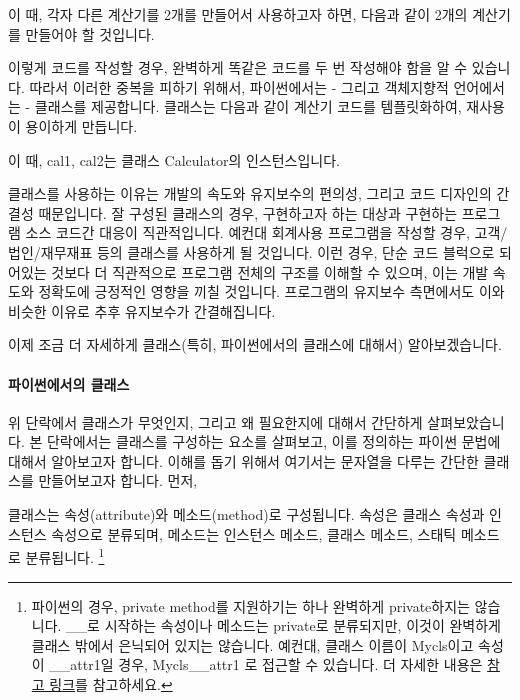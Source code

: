 \documentclass[titlepage]{report}
\begin{document}


이 때, 각자 다른 계산기를 2개를 만들어서 사용하고자 하면, 다음과 같이 2개의 계산기를 만들어야 할 것입니다.



이렇게 코드를 작성할 경우, 완벽하게 똑같은 코드를 두 번 작성해야 함을 알 수 있습니다. 따라서 이러한 중복을 피하기 위해서, 파이썬에서는 - 그리고 객체지향적 언어에서는 - 클래스를 제공합니다. 클래스는 다음과 같이 계산기 코드를 템플릿화하여, 재사용이 용이하게 만듭니다. 




이 때, cal1, cal2는 클래스 Calculator의 인스턴스입니다. 

클래스를 사용하는 이유는 개발의 속도와 유지보수의 편의성, 그리고 코드 디자인의 간결성 때문입니다. 잘 구성된 클래스의 경우, 구현하고자 하는 대상과 구현하는 프로그램 소스 코드간 대응이 직관적입니다. 예컨대 회계사용 프로그램을 작성할 경우, 고객/법인/재무재표 등의 클래스를 사용하게 될 것입니다. 이런 경우, 단순 코드 블럭으로 되어있는 것보다 더 직관적으로 프로그램 전체의 구조를 이해할 수 있으며, 이는 개발 속도와 정확도에 긍정적인 영향을 끼칠 것입니다. 프로그램의 유지보수 측면에서도 이와 비슷한 이유로 추후 유지보수가 간결해집니다. 

이제 조금 더 자세하게 클래스(특히, 파이썬에서의 클래스에 대해서) 알아보겠습니다. 

\paragraph{파이썬에서의 클래스} 

위 단락에서 클래스가 무엇인지, 그리고 왜 필요한지에 대해서 간단하게 살펴보았습니다. 본 단락에서는 클래스를 구성하는 요소를 살펴보고, 이를 정의하는 파이썬 문법에 대해서 알아보고자 합니다. 이해를 돕기 위해서 여기서는 문자열을 다루는 간단한 클래스를 만들어보고자 합니다. 먼저, 

클래스는 속성(attribute)와 메소드(method)로 구성됩니다. 속성은 클래스 속성과 인스턴스 속성으로 분류되며, 메소드는 인스턴스 메소드, 클래스 메소드, 스태틱 메소드로 분류됩니다. \footnote{파이썬의 경우, private method를 지원하기는 하나 완벽하게 private하지는 않습니다. \_\_로 시작하는 속성이나 메소드는 private로 분류되지만, 이것이 완벽하게 클래스 밖에서 은닉되어 있지는 않습니다. 예컨대, 클래스 이름이 Mycls이고 속성이 \_\_attr1일 경우, Mycls\_\_attr1 로 접근할 수 있습니다. 더 자세한 내용은 \href{http://www.diveintopython.net/object\_oriented\_framework/private\_functions.html}{참고 링크}를 참고하세요. } 
\end{document}
